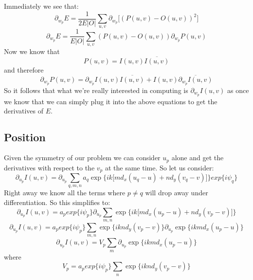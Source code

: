 \documentclass[12pt,a6paper]{book}
\begin{document}
Immediately we see that:
\begin{equation}
\partial_{w_p}E=\frac{1}{2E|O|}\sum_{u,v}\partial_{w_p}\lbrack(P(u,v) - O(u,v))^2\rbrack
\end{equation}
\begin{equation}
\partial_{w_p}E=\frac{1}{E|O|}\sum_{u,v}(P(u,v) - O(u,v))\partial_{w_p}P(u,v)
\end{equation}
Now we know that
\begin{equation}
P(u,v)=I(u,v)\overline{I(u,v)}
\end{equation}
and therefore
\begin{equation}
\partial_{w_p}P(u,v)=\partial_{w_p}I(u,v)\overline{I(u,v)}+I(u,v)\overline{\partial_{w_p}I(u,v)}
\end{equation}
So it follows that what we're really interested in computing is $\partial_{w_p}I(u,v)$ as once we know that we can simply plug it into the above equations to get the derivatives of $E$.

\subsection{Position}
Given the symmetry of our problem we can consider $u_p$ alone and get the derivatives with respect to the $v_p$ at the same time. So let us consider:
\begin{equation}
\partial_{u_p}I(u, v) = \partial_{u_p}\sum_{q,m,n}a_q\exp\lbrace ik \lbrack md_x(u_q-u)+nd_y(v_q-v)\rbrack\rbrace exp\lbrace i\psi_q \rbrace
\end{equation}
Right away we know all the terms where $p\neq q$ will drop away under differentiation. So this simplifies to:
\begin{equation}
\partial_{u_p}I(u, v) = a_p exp\lbrace i\psi_p \rbrace \partial_{u_p}\sum_{m,n}\exp\lbrace ik \lbrack md_x(u_p-u)+nd_y(v_p-v)\rbrack\rbrace 
\end{equation}
\begin{equation}
\partial_{u_p}I(u, v) = a_p exp\lbrace i\psi_p \rbrace \sum_{m,n} \exp\lbrace iknd_y(v_p-v)\rbrace \partial_{u_p}\exp\lbrace ikmd_x(u_p-u)\rbrace  
\end{equation}
\begin{equation}
\partial_{u_p}I(u, v) =V_p\sum_{m}\partial_{u_p}\exp\lbrace ikmd_x(u_p-u)\rbrace  
\end{equation}
where
\begin{equation}
V_p = a_p exp\lbrace i\psi_p \rbrace \sum_{n} \exp\lbrace iknd_y(v_p-v)\rbrace
\end{equation}
\end{document}

